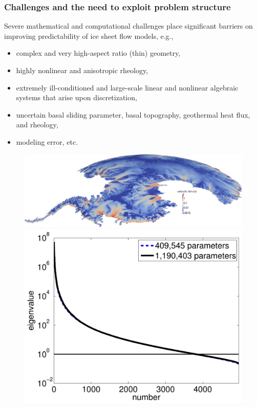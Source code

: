 \documentclass[10pt,final,xcolor=dvipsnames]{beamer}
\begin{document}
\begin{frame}
  \frametitle{Challenges and the need to exploit problem structure}

  Severe mathematical and computational challenges place significant
  barriers on improving predictability of ice sheet flow models, e.g.,
  
  \begin{minipage}{.6\columnwidth}
    \begin{itemize}
    \item complex and very high-aspect ratio (thin) geometry,
    \item highly nonlinear and anisotropic rheology,
    \item extremely ill-conditioned and large-scale linear and
      nonlinear algebraic systems that arise upon discretization,
    \item uncertain basal sliding parameter, basal topography,
      geothermal heat flux, and rheology,
    \item modeling error, etc.
    \end{itemize}
    
  \end{minipage}\hfill
  \begin{minipage}{.4\columnwidth}
    \begin{figure}\centering
      \includegraphics[width=0.99\columnwidth]{extraplots/antarctica_uobs_rotsurface_larger}\\
      \vspace{0.2in}
      \centering\includegraphics[width=0.65\columnwidth]{extraplots/spec_ppmisfit_hess_coarseandfine_new.pdf}
    \end{figure}
  \end{minipage}


\end{frame}
\end{document}
